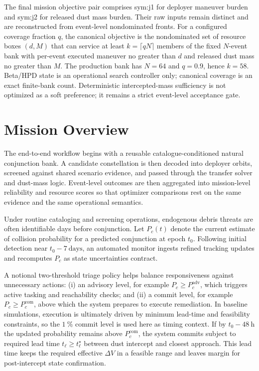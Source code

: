     The final mission objective pair comprises \gls{sym:j1} for deployer maneuver burden and \gls{sym:j2} for released dust mass burden. Their raw inputs remain distinct and are reconstructed from event-level nondominated fronts. For a configured coverage fraction \(q\), the canonical objective is the nondominated set of resource boxes \((d,M)\) that can service at least \(k=\lceil qN\rceil\) members of the fixed \(N\)-event bank with per-event executed maneuver no greater than \(d\) and released dust mass no greater than \(M\). The production bank has \(N=64\) and \(q=0.9\), hence \(k=58\). Beta/HPD state is an operational search controller only; canonical coverage is an exact finite-bank count. Deterministic intercepted-mass sufficiency is not optimized as a soft preference; it remains a strict event-level acceptance gate.

\section{Mission Overview} \label{se:mission}
    The end-to-end workflow begins with a reusable catalogue-conditioned natural conjunction bank. A candidate constellation is then decoded into deployer orbits, screened against shared scenario evidence, and passed through the transfer solver and dust-mass logic. Event-level outcomes are then aggregated into mission-level reliability and resource scores so that optimizer comparisons rest on the same evidence and the same operational semantics.

    Under routine cataloging and screening operations, endogenous debris threats are often identifiable days before conjunction. Let \(P_c(t)\) denote the current estimate of collision probability for a predicted conjunction at epoch \(t_0\). Following initial detection near \(t_0-7~\mathrm{days}\), an automated monitor ingests refined tracking updates and recomputes \(P_c\) as state uncertainties contract.

    A notional two-threshold triage policy helps balance responsiveness against unnecessary actions: (i) an advisory level, for example \(P_c \ge P_c^\mathrm{adv}\), which triggers active tasking and reachability checks; and (ii) a commit level, for example \(P_c \ge P_c^\mathrm{com}\), above which the system prepares to execute remediation. In baseline simulations, execution is ultimately driven by minimum lead-time and feasibility constraints, so the \(\SI{1}{\%}\) commit level is used here as timing context. If by \(t_0-48~\mathrm{h}\) the updated probability remains above \(P_c^\mathrm{com}\), the system commits subject to required lead time \(t_\ell \ge t_\ell^\star\) between dust intercept and closest approach. This lead time keeps the required effective \(\Delta V\) in a feasible range and leaves margin for post-intercept state confirmation.

